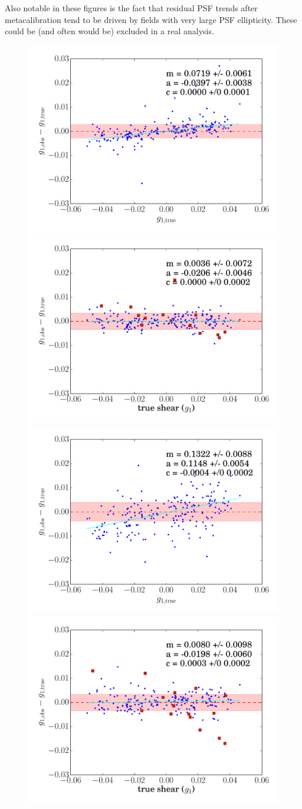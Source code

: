 \documentclass[iop]{emulateapj}
\begin{document}
Also notable in these figures is the fact that residual PSF trends
after metacalibration tend to be driven by fields with very large PSF
ellipticity. These could be (and often would be) excluded in a real
analysis. 
\begin{figure}[t]
\begin{center}
\includegraphics[width=0.46\linewidth]{./Plots/m1-no_corrections-regauss.pdf}
\includegraphics[width=0.46\linewidth]{./Plots/m1-regauss-opt-shear_plots.pdf}\\
\includegraphics[width=0.46\linewidth]{./Plots/m1-no_corrections-ksb.pdf}
\includegraphics[width=0.46\linewidth]{./Plots/m1-ksb-opt-shear_plots.pdf}\\

\end{center}
\end{figure}
\end{document}
